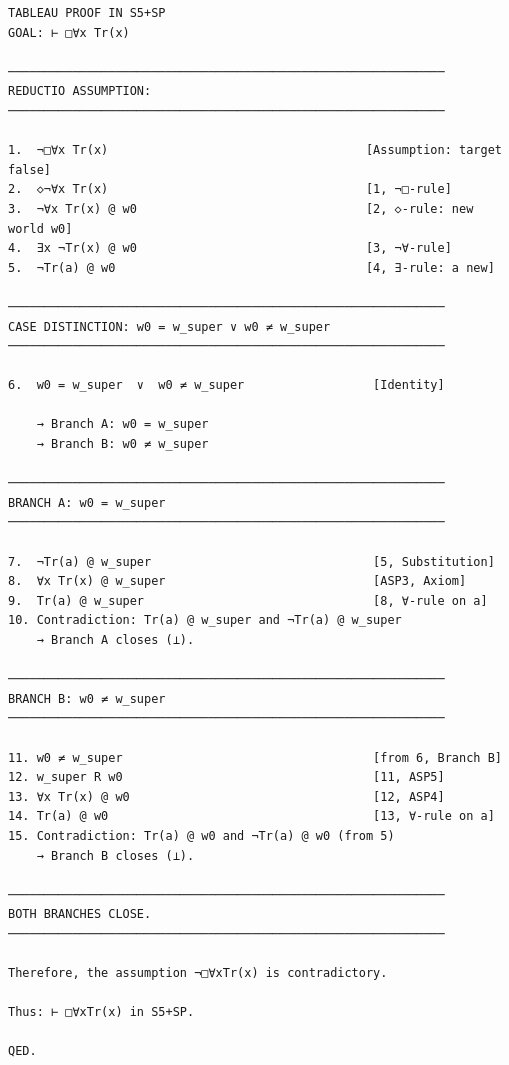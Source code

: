 \documentclass[
]{article}
\begin{document}
\begin{verbatim}
TABLEAU PROOF IN S5+SP
GOAL: ⊢ □∀x Tr(x)

─────────────────────────────────────────────────────────────
REDUCTIO ASSUMPTION:
─────────────────────────────────────────────────────────────

1.  ¬□∀x Tr(x)                                    [Assumption: target false]
2.  ◇¬∀x Tr(x)                                    [1, ¬□-rule]
3.  ¬∀x Tr(x) @ w0                                [2, ◇-rule: new world w0]
4.  ∃x ¬Tr(x) @ w0                                [3, ¬∀-rule]
5.  ¬Tr(a) @ w0                                   [4, ∃-rule: a new]

─────────────────────────────────────────────────────────────
CASE DISTINCTION: w0 = w_super ∨ w0 ≠ w_super
─────────────────────────────────────────────────────────────

6.  w0 = w_super  ∨  w0 ≠ w_super                  [Identity]

    → Branch A: w0 = w_super
    → Branch B: w0 ≠ w_super

─────────────────────────────────────────────────────────────
BRANCH A: w0 = w_super
─────────────────────────────────────────────────────────────

7.  ¬Tr(a) @ w_super                               [5, Substitution]
8.  ∀x Tr(x) @ w_super                             [ASP3, Axiom]
9.  Tr(a) @ w_super                                [8, ∀-rule on a]
10. Contradiction: Tr(a) @ w_super and ¬Tr(a) @ w_super
    → Branch A closes (⊥).

─────────────────────────────────────────────────────────────
BRANCH B: w0 ≠ w_super
─────────────────────────────────────────────────────────────

11. w0 ≠ w_super                                   [from 6, Branch B]
12. w_super R w0                                   [11, ASP5]
13. ∀x Tr(x) @ w0                                  [12, ASP4]
14. Tr(a) @ w0                                     [13, ∀-rule on a]
15. Contradiction: Tr(a) @ w0 and ¬Tr(a) @ w0 (from 5)
    → Branch B closes (⊥).

─────────────────────────────────────────────────────────────
BOTH BRANCHES CLOSE.
─────────────────────────────────────────────────────────────

Therefore, the assumption ¬□∀xTr(x) is contradictory.

Thus: ⊢ □∀xTr(x) in S5+SP.

QED.
\end{verbatim}
\end{document}
